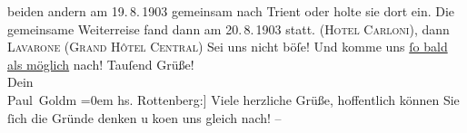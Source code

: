 \begin{ledgroupsized}[t]{13cm}
{{{                  beiden andern am 19. 8. 1903 gemeinsam nach Trient
                  oder holte sie dort ein. Die gemeinsame Weiterreise fand dann am 20. 8. 1903
                  statt.}}}\label{K_L03384-11h} (\textsc{Hotel Carloni}), dann \textsc{Lavarone} (\textsc{Grand Hôtel Central})\pend
           \pstart
           {\pb}Sei uns nicht böſe! Und komme uns \uline{ſo bald als möglich} nach!\pend
           \pstart
           Tauſend Grüße! {\\[\baselineskip]}Dein {\\[\baselineskip]}\spacefill\mbox{Paul Goldm}\pend
           \leftskip=0em{}\pstart
           \noindent{}{[}hs. Rottenberg:{]} Viele herzliche Grüße, hoffentlich können Sie ſich
                  die Gründe denken u ko{\geminationm}en uns gleich nach! –\pend
           
         
         \endnumbering{}\end{ledgroupsized}\begin{anhang}\end{anhang}\newcommand{\dateiname}{L03384}\newcommand{\titel}{Paul Goldmann und Theodore Rottenberg an Arthur Schnitzler, 18. 8. [1903]}\newcommand{\editorInnen}{Martin Anton Müller und Laura Untner}
      